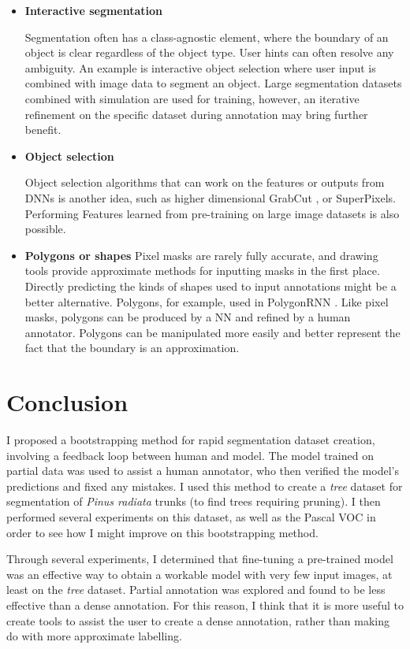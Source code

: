 \begin{itemize}
    
\item  {\bf Interactive segmentation} \par
Segmentation often has a class-agnostic element, where the boundary of an object is clear regardless of the object type. User hints can often resolve any ambiguity. An example is interactive object selection \cite{Xu2016, Xu2017} where user input is combined with image data to segment an object. Large segmentation datasets combined with simulation are used for training, however, an iterative refinement on the specific dataset during annotation may bring further benefit.

\item  {\bf Object selection} \par
Object selection algorithms that can work on the features or outputs from \gls{DNN}s is another idea, such as higher dimensional GrabCut \cite{Xu2016a}, or SuperPixels. Performing Features learned from pre-training on large image datasets is also possible.

\item  {\bf Polygons or shapes}
Pixel masks are rarely fully accurate, and drawing tools provide approximate methods for inputting masks in the first place. Directly predicting the kinds of shapes used to input annotations might be a better alternative. Polygons, for example, used in PolygonRNN \cite{Castrejon2017}. Like pixel masks, polygons can be produced by a \gls{NN} and refined by a human annotator. Polygons can be manipulated more easily and better represent the fact that the boundary is an approximation.
\end{itemize}

\section {Conclusion}

I proposed a bootstrapping method for rapid segmentation dataset creation, involving a feedback loop between human and model. The model trained on partial data was used to assist a human annotator, who then verified the model's predictions and fixed any mistakes. I used this method to create a \emph{tree} dataset for segmentation of \emph{Pinus radiata} trunks (to find trees requiring pruning). I then performed several experiments on this dataset, as well as the Pascal VOC in order to see how I might improve on this bootstrapping method. 

Through several experiments, I determined that fine-tuning a pre-trained model was an effective way to obtain a workable model with very few input images, at least on the \emph{tree} dataset. Partial annotation was explored and found to be less effective than a dense annotation. For this reason, I think that it is more useful to create tools to assist the user to create a dense annotation, rather than making do with more approximate labelling. 